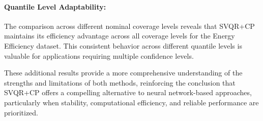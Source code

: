 \documentclass{article}
\begin{document}
\paragraph{Quantile Level Adaptability:} The comparison across different nominal coverage levels reveals that SVQR+CP maintains its efficiency advantage across all coverage levels for the Energy Efficiency dataset. This consistent behavior across different quantile levels is valuable for applications requiring multiple confidence levels.

These additional results provide a more comprehensive understanding of the strengths and limitations of both methods, reinforcing the conclusion that SVQR+CP offers a compelling alternative to neural network-based approaches, particularly when stability, computational efficiency, and reliable performance are prioritized.
\end{document}
